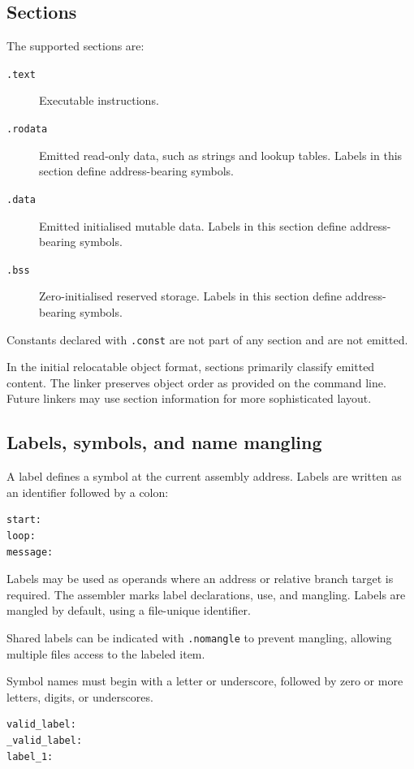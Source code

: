 \subsection{Sections}

The supported sections are:

\begin{description}
    \item[\texttt{.text}] Executable instructions.
    \item[\texttt{.rodata}] Emitted read-only data, such as strings and lookup tables.
    Labels in this section define address-bearing symbols.
    \item[\texttt{.data}] Emitted initialised mutable data.
    Labels in this section define address-bearing symbols.
    \item[\texttt{.bss}] Zero-initialised reserved storage.
    Labels in this section define address-bearing symbols.
\end{description}

Constants declared with \texttt{.const} are not part of any section and are not emitted.

In the initial relocatable object format, sections primarily classify emitted content.
The linker preserves object order as provided on the command line. Future linkers may
use section information for more sophisticated layout.

\subsection{Labels, symbols, and name mangling}

A label defines a symbol at the current assembly address. Labels are written as an
identifier followed by a colon:

\begin{verbatim}
start:
loop:
message:
\end{verbatim}

Labels may be used as operands where an address or relative branch target is required.
The assembler marks label declarations, use, and mangling. Labels are mangled by
default, using a file-unique identifier.

Shared labels can be indicated with \texttt{.nomangle} to prevent mangling, allowing
multiple files access to the labeled item.

Symbol names must begin with a letter or underscore, followed by zero or more letters,
digits, or underscores.

\begin{verbatim}
valid_label:
_valid_label:
label_1:

\end{verbatim}

